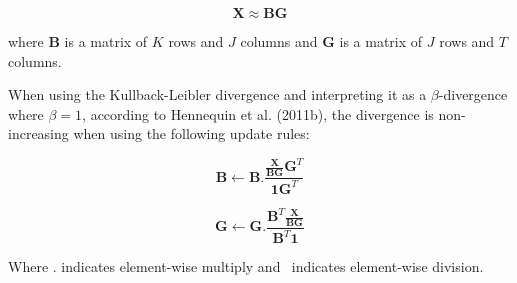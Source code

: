 \documentclass[72pt]{article}
\begin{document}
\begin{Huge}
\[ \mathbf{X} \approx \mathbf{B}\mathbf{G} \]

where \( \mathbf{B} \) is a matrix of \( K \) rows and \( J \) columns and \(
\mathbf{G} \) is a matrix of \( J \) rows and \( T \) columns.

\newpage

When using the Kullback-Leibler divergence and interpreting it as a
\(\beta\)-divergence where \(\beta = 1 \), according to Hennequin et al.
(2011b), the divergence is non-increasing when using the following update rules:

\[ \mathbf{B} \gets
\mathbf{B}.\frac{\frac{\mathbf{X}}{\mathbf{B}\mathbf{G}}\mathbf{G}^T}
    {\mathbf{1}\mathbf{G}^T}
\]

\[ \mathbf{G} \gets
\mathbf{G}.\frac{\mathbf{B}^T\frac{\mathbf{X}}{\mathbf{B}\mathbf{G}}}
    {\mathbf{B}^{T}\mathbf{1}}
\]

Where \( . \) indicates element-wise multiply and \( \frac{}{} \) indicates
element-wise division.



\end{Huge}
\end{document}
